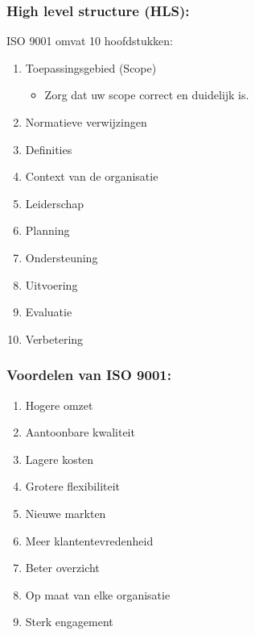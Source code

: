 \documentclass[12pt]{article}
\begin{document}
\subsubsection{High level structure (HLS):}
ISO 9001 omvat 10 hoofdstukken:\begin{enumerate}
    \item Toepassingsgebied (Scope)\begin{itemize}
        \item Zorg dat uw scope correct en duidelijk is.
    \end{itemize}
    \item Normatieve verwijzingen
    \item Definities
    \item Context van de organisatie
    \item Leiderschap
    \item Planning
    \item Ondersteuning
    \item Uitvoering
    \item Evaluatie
    \item Verbetering
\end{enumerate}
\subsubsection{Voordelen van ISO 9001:}
\begin{enumerate}
    \item Hogere omzet
    \item Aantoonbare kwaliteit
    \item Lagere kosten
    \item Grotere flexibiliteit
    \item Nieuwe markten
    \item Meer klantentevredenheid
    \item Beter overzicht
    \item Op maat van elke organisatie
    \item Sterk engagement
\end{enumerate}
\end{document}
